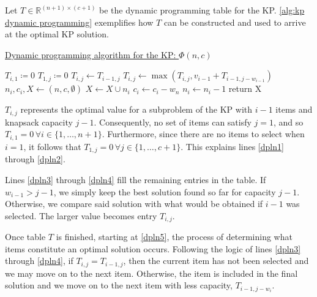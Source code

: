 Let $T \in \mathbb{R}^{(n+1) \times (c+1)}$ be the dynamic programming table for the KP. \cref{alg:kp dynamic programming} exemplifies how $T$ can be constructed and used to arrive at the optimal KP solution.

\begin{algorithm}
    \caption{\href{https://github.com/phcentenaro7/IC-Knapsack/blob/main/Knapsack/USP/dynamic_knapsack.jl}{Dynamic programming algorithm for the KP: $\Phi(n, c)$}}
    \label{alg:kp dynamic programming}
    \begin{algorithmic}[1]
         \label{dpln1}
            \State $T_{i,1} \coloneqq 0$
        \EndFor
            \State $T_{1,j} \coloneqq 0$ \label{dpln2}
             \label{dpln3}
                \State $T_{i,j} \gets T_{i-1,j}$
                    \State $T_{i,j} \gets \max{(T_{i,j}, v_{i-1} + T_{i-1,j-w_{i-1}})}$\label{dpln4}
                \EndIf
            \EndFor
        \EndFor
        \State $n_i, c_i, X \gets (n, c, \emptyset)$
         \label{dpln5}
                \State $X \gets X \cup n_i$
                \State $c_i \gets c_i - w_n$
            \EndIf
            \State $n_i \gets n_i - 1$
        \EndWhile
        \State return X
    \end{algorithmic}
\end{algorithm}

$T_{i,j}$ represents the optimal value for a subproblem of the KP with $i - 1$ items and knapsack capacity $j - 1$. Consequently, no set of items can satisfy $j = 1$, and so $T_{i,1} = 0 \, \forall i \in \{1,\dots,n + 1\}$. Furthermore, since there are no items to select when $i = 1$, it follows that $T_{1,j} = 0 \, \forall j \in \{1,\dots,c + 1\}$. This explains lines \ref{dpln1} through \ref{dpln2}.

Lines \ref{dpln3} through \ref{dpln4} fill the remaining entries in the table. If $w_{i-1} > j - 1$, we simply keep the best solution found so far for capacity $j - 1$. Otherwise, we compare said solution with what would be obtained if $i - 1$ was selected. The larger value becomes entry $T_{i,j}$.

Once table $T$ is finished, starting at \cref{dpln5}, the process of determining what items constitute an optimal solution occurs. Following the logic of lines \ref{dpln3} through \ref{dpln4}, if $T_{i,j} = T_{i-1,j}$, then the current item has not been selected and we may move on to the next item. Otherwise, the item is included in the final solution and we move on to the next item with less capacity, $T_{i-1,j-w_i}$.

